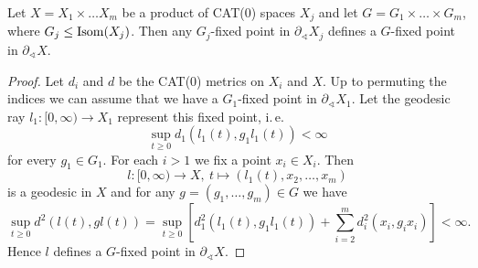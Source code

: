 \begin{lemma}[{\cite[Lemma~2.9]{MR3509968}}]
  \label{lem:2.9}
  Let \(X = X_1 \times \dots X_m\) be a product of CAT(0) spaces \(X_j\) and let \(G = G_1 \times \dots \times G_m\), where \(G_j \leq \operatorname{Isom}(X_j)\). Then any \(G_j\)-fixed point in \(\partial_\sphericalangle X_j\) defines a \(G\)-fixed point in \(\partial_\sphericalangle X\).
\end{lemma}

\begin{proof}
  Let \(d_i\) and \(d\) be the CAT(0) metrics on \(X_i\) and \(X\). Up to permuting the indices we can assume that we have a \(G_1\)-fixed point in \(\partial_\sphericalangle X_1\). Let the geodesic ray \(l_1\colon [0,\infty) \to X_1\) represent this fixed point, i.\,e.\
  \[
    \sup_{t \geq 0} d_1(l_1(t), g_1l_1(t)) < \infty
  \]
  for every \(g_1 \in G_1\). For each \(i > 1\) we fix a point \(x_i \in X_i\). Then
  \[
    l\colon [0, \infty) \to X,\ t \mapsto (l_1(t), x_2, \dots, x_m)
  \]
  is a geodesic in \(X\) and for any \(g = (g_1, \dots, g_m) \in G\) we have
  \[
    \sup_{t \geq 0} d^2(l(t), gl(t)) = \sup_{t \geq 0} \left [ d_1^2(l_1(t), g_1l_1(t)) + \sum_{i=2}^m d_i^2(x_i, g_ix_i)\right] < \infty.
  \]
  Hence \(l\) defines a \(G\)-fixed point in \(\partial_\sphericalangle X\).
\end{proof}


